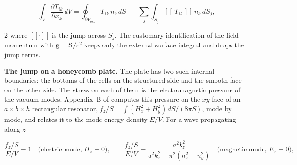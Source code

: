 \[
\int_V \frac{\partial T_{ik}}{\partial x_k}\,dV
= \oint_{\partial V_{\mathrm{ext}}} T_{ik}\,n_k\,dS
\;-\; \sum_j \int_{S_j} [\![\,T_{ik}\,]\!]\,n_k\,dS_j ,
\]
\begin{multicols}{2}
where $[\![\cdot]\!]$ is the jump across $S_j$. The customary identification of the
field momentum with $\mathbf{g}=\mathbf{S}/c^2$ keeps only the external surface
integral and drops the jump terms.

\textbf{The jump on a honeycomb plate.}
The plate has two such internal boundaries: the bottoms of the cells on the
structured side and the smooth face on the other side. The stress on each of them is
the electromagnetic pressure of the vacuum modes. Appendix~B of \cite{Drozdov2024}
computes this pressure on the $xy$ face of an $a\times b\times h$ rectangular
resonator, $f_z/S=\int(H_x^2+H_y^2)\,dS/(8\pi S)$, mode by mode, and relates it
to the mode energy density $E/V$. For a wave propagating along $z$
\end{multicols}
\[
\frac{f_z/S}{E/V}=1 \quad\text{(electric mode, } H_z=0\text{)},
\qquad
\frac{f_z/S}{E/V}=\frac{a^2k_z^2}{a^2k_z^2+\pi^2(n_x^2+n_y^2)} \quad\text{(magnetic mode, } E_z=0\text{)},
\]
